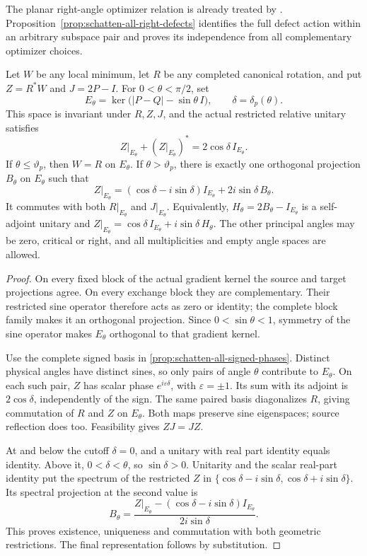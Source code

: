The planar right-angle optimizer relation is already treated by
\citet[Lemma~3.3]{bolotnikov2001minimal}. Proposition~\ref{prop:schatten-all-right-defects}
identifies the full defect action within an arbitrary subspace pair
and proves its independence from all complementary optimizer choices.

\begin{proposition}
\label{prop:schatten-intrinsic-angle-parameter}
Let $W$ be any local minimum, let $R$ be any completed canonical rotation,
and put $Z=R^*W$ and $J=2P-I$. For $0<\theta<\pi/2$, set
\[
 E_\theta=\ker\bigl(|P-Q|-\sin\theta\,I\bigr),\qquad
 \delta=\delta_p(\theta).
\]
This space is invariant under $R,Z,J$, and the actual restricted relative
unitary satisfies
\[
 Z|_{E_\theta}+(Z|_{E_\theta})^*=2\cos\delta\,I_{E_\theta}.
\]
If $\theta\leq\vartheta_p$, then $W=R$ on $E_\theta$.
If $\theta>\vartheta_p$, there is exactly one orthogonal projection
$B_\theta$ on $E_\theta$ such that
\[
 Z|_{E_\theta}
   =(\cos\delta-i\sin\delta)I_{E_\theta}
       +2i\sin\delta\,B_\theta.
\]
It commutes with both $R|_{E_\theta}$ and $J|_{E_\theta}$.
Equivalently, $H_\theta=2B_\theta-I_{E_\theta}$ is a self-adjoint unitary
and $Z|_{E_\theta}=\cos\delta\,I_{E_\theta}+i\sin\delta\,H_\theta$.
The other principal angles may be zero, critical or right, and all
multiplicities and empty angle spaces are allowed.
\end{proposition}

\begin{proof}
On every fixed block of the actual gradient kernel the source and target
projections agree. On every exchange block they are complementary.
Their restricted sine operator therefore acts as zero or identity;
the complete block family makes it an orthogonal projection.
Since $0<\sin\theta<1$, symmetry of the sine operator makes
$E_\theta$ orthogonal to that gradient kernel.

Use the complete signed basis in
\cref{prop:schatten-all-signed-phases}. Distinct physical angles have
distinct sines, so only pairs of angle $\theta$ contribute to
$E_\theta$. On each such pair, $Z$ has scalar phase
$e^{i\varepsilon\delta}$, with $\varepsilon=\pm1$.
Its sum with its adjoint is $2\cos\delta$, independently of the sign.
The same paired basis diagonalizes $R$, giving commutation of $R$ and
$Z$ on $E_\theta$. Both maps preserve sine eigenspaces; source reflection
does too. Feasibility gives $ZJ=JZ$.

At and below the cutoff $\delta=0$, and a unitary with real part
identity equals identity. Above it, $0<\delta<\theta$, so
$\sin\delta>0$. Unitarity and the scalar real-part identity put the
spectrum of the restricted $Z$ in
$\{\cos\delta-i\sin\delta,\cos\delta+i\sin\delta\}$.
Its spectral projection at the second value is
\[
 B_\theta=
 \frac{Z|_{E_\theta}-(\cos\delta-i\sin\delta)I_{E_\theta}}
      {2i\sin\delta}.
\]
This proves existence, uniqueness and commutation with both geometric
restrictions. The final representation follows by substitution.
\end{proof}

